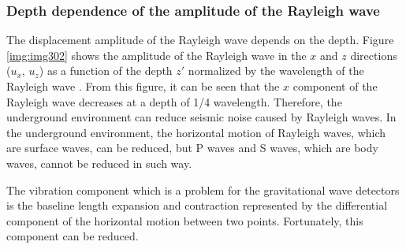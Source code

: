 \subsubsection{Depth dependence of the amplitude of the Rayleigh wave}
The displacement amplitude of the Rayleigh wave depends on the depth. Figure \ref{img:img302} shows the amplitude of the Rayleigh wave in the $x$ and $z$ directions ($u_x,\, u_z$) as a function of the depth $z'$ normalized by the wavelength of the Rayleigh wave \cite{hasegawa2015jishin}. From this figure, it can be seen that the $x$ component of the Rayleigh wave decreases at a depth of 1/4 wavelength. Therefore, the underground environment can reduce seismic noise caused by Rayleigh waves. In the underground environment, the horizontal motion of Rayleigh waves, which are surface waves, can be reduced, but P waves and S waves, which are body waves, cannot be reduced in such way.

The vibration component which is a problem for the gravitational wave detectors is the baseline length expansion and contraction represented by the differential component of the horizontal motion between two points. Fortunately, this component can be reduced.

